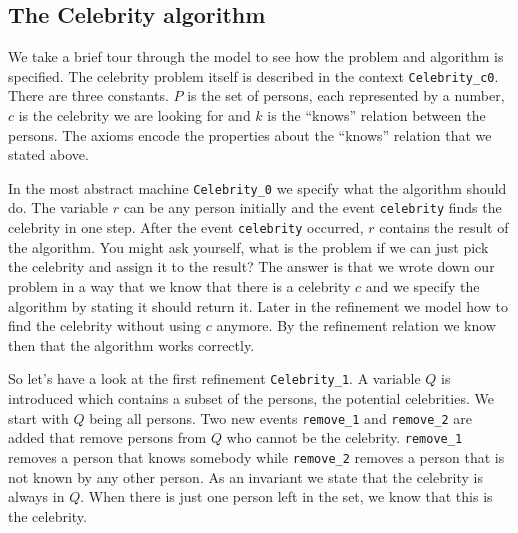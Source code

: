 \begin{description}
\begin{description}
		\AnyPrm
			\begin{description}
			\end{description}
		\WhereGrd
			\begin{description}
			\nItemX{ grd1 }{ x \in  R }
			\nItemX{ grd2 }{ x \mapsto  b \notin  k }
			\end{description}
		\Witnesses
			\begin{description}
			\nItem{ y }{ b=y }
			\end{description}
		\ThenAct
			\begin{description}
			\nItemX{ act2 }{ b :=  x }
			\nItemX{ act1 }{ R :=  R \setminus  \{ x\}  }
			\end{description}
		\EndAct
		\end{description}
\END
\end{description}

\subsection{The Celebrity algorithm}
\label{the_celebrity_algorithm}
We take a brief tour through the model to see how the problem and algorithm is specified.
The celebrity problem itself is described in the context \texttt{Celebrity\_c0}. There are
  three constants. $P$ is the set of persons, each represented by a number, $c$ is the celebrity
  we are looking for and $k$ is the ``knows'' relation between the persons.
The axioms encode the properties about the ``knows'' relation that we stated above.

In the most abstract machine \texttt{Celebrity\_0} we specify what the algorithm should do.
The variable $r$ can be any person initially and the event \texttt{celebrity} 
  finds the celebrity in one step. 
After the event \texttt{celebrity} occurred, $r$ contains the result of the algorithm.
You might ask yourself, what is the problem if we can just pick the celebrity and
  assign it to the result?
The answer is that we wrote down our problem in a way that we know that there is a celebrity $c$
  and we specify the algorithm by stating it should return it.
Later in the refinement we model how to find the celebrity without using $c$ anymore.
By the refinement relation we know then that the algorithm works correctly.

So let's have a look at the first refinement \texttt{Celebrity\_1}. 
A variable $Q$ is introduced which contains a subset of the persons, the potential celebrities.
We start with $Q$ being all persons.
Two new events  \texttt{remove\_1} and \texttt{remove\_2} are added that remove persons
  from $Q$ who cannot be the celebrity.
\texttt{remove\_1} removes a person that knows somebody while \texttt{remove\_2}
  removes a person that is not known by any other person.
As an invariant we state that the celebrity is always in $Q$.
When there is just one person left in the set, we know that this is the celebrity.

